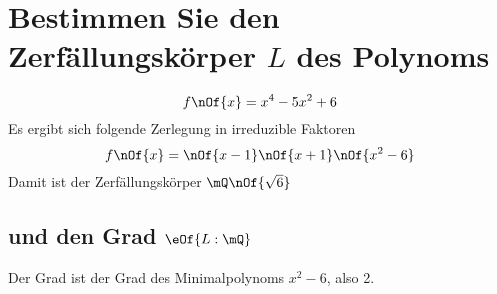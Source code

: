 \section{Bestimmen Sie den Zerfällungskörper $L$ des Polynoms}
\begin{equation}
	f\nOf{x} = x^4 - 5 x^2 + 6
\end{equation}
Es ergibt sich folgende Zerlegung in irreduzible Faktoren
\begin{equation}
	f\nOf{x} = \nOf{x-1}\nOf{x+1}\nOf{x^2-6}
\end{equation}
Damit ist der Zerfällungskörper $\mQ\nOf{\sqrt{6}}$ 

\subsection{und den Grad $\eOf{L:\mQ}$}
Der Grad ist der Grad des Minimalpolynoms $x^2 - 6$, also 2.